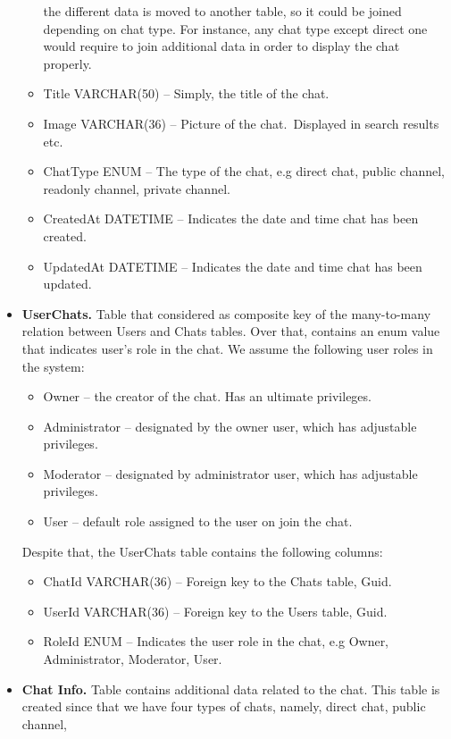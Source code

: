 \begin{itemize}
\begin{itemize}
        the different data is moved to another table, so it could be joined depending on chat type.
        For instance, any chat type except direct one would require to join additional data in order to display the chat properly.
        \item Title VARCHAR(50) -- Simply, the title of the chat.
        \item Image VARCHAR(36) -- Picture of the chat.\ Displayed in search results etc.
        \item ChatType ENUM -- The type of the chat, e.g direct chat, public channel, readonly channel, private channel.
        \item CreatedAt DATETIME -- Indicates the date and time chat has been created.
        \item UpdatedAt DATETIME -- Indicates the date and time chat has been updated.
    \end{itemize}
    \item \textbf{UserChats.} Table that considered as composite key of the many-to-many relation between Users and Chats tables.
    Over that, contains an enum value that indicates user's role in the chat.
    We assume the following user roles in the system:
    \begin{itemize}
        \item Owner -- the creator of the chat.
        Has an ultimate privileges.
        \item Administrator -- designated by the owner user, which has adjustable privileges.
        \item Moderator -- designated by administrator user, which has adjustable privileges.
        \item User -- default role assigned to the user on join the chat.
    \end{itemize}
    Despite that, the UserChats table contains the following columns:
    \begin{itemize}
        \item ChatId VARCHAR(36) -- Foreign key to the Chats table, Guid.
        \item UserId VARCHAR(36) -- Foreign key to the Users table, Guid.
        \item RoleId ENUM -- Indicates the user role in the chat, e.g Owner, Administrator, Moderator, User.
    \end{itemize}
    \item \textbf{Chat Info.} Table contains additional data related to the chat.
    This table is created since that we have four types of chats, namely, direct chat, public channel,

\end{itemize}
